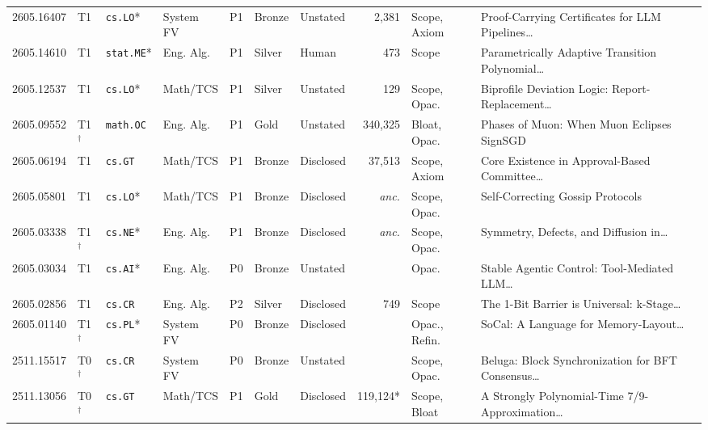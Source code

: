 \documentclass[11pt,letterpaper]{article}
\begin{document}
\begin{longtable}{lllllllrl>{\raggedright\arraybackslash}p{4.05cm}}
2605.16407 & T1 & \texttt{cs.LO}* & System FV & P1 & Bronze & Unstated & 2,381 & Scope, Axiom & Proof-Carrying Certificates for LLM Pipelines\dots~\cite{arxiv2605_16407} \\
2605.14610 & T1 & \texttt{stat.ME}* & Eng. Alg. & P1 & Silver & Human & 473 & Scope & Parametrically Adaptive Transition Polynomial\dots~\cite{arxiv2605_14610} \\
2605.12537 & T1 & \texttt{cs.LO}* & Math/TCS & P1 & Silver & Unstated & 129 & Scope, Opac. & Biprofile Deviation Logic: Report-Replacement\dots~\cite{arxiv2605_12537} \\
2605.09552 & T1$^\dagger$ & \texttt{math.OC} & Eng. Alg. & P1 & Gold & Unstated & 340,325 & Bloat, Opac. & Phases of Muon: When Muon Eclipses SignSGD~\cite{arxiv2605_09552} \\
2605.06194 & T1 & \texttt{cs.GT} & Math/TCS & P1 & Bronze & Disclosed & 37,513 & Scope, Axiom & Core Existence in Approval-Based Committee\dots~\cite{arxiv2605_06194} \\
2605.05801 & T1 & \texttt{cs.LO}* & Math/TCS & P1 & Bronze & Disclosed & \emph{anc.} & Scope, Opac. & Self-Correcting Gossip Protocols~\cite{arxiv2605_05801} \\
2605.03338 & T1$^\dagger$ & \texttt{cs.NE}* & Eng. Alg. & P1 & Bronze & Disclosed & \emph{anc.} & Scope, Opac. & Symmetry, Defects, and Diffusion in\dots~\cite{arxiv2605_03338} \\
2605.03034 & T1 & \texttt{cs.AI}* & Eng. Alg. & P0 & Bronze & Unstated & \textemdash{} & Opac. & Stable Agentic Control: Tool-Mediated LLM\dots~\cite{arxiv2605_03034} \\
2605.02856 & T1 & \texttt{cs.CR} & Eng. Alg. & P2 & Silver & Disclosed & 749 & Scope & The 1-Bit Barrier is Universal: k-Stage\dots~\cite{arxiv2605_02856} \\
2605.01140 & T1$^\dagger$ & \texttt{cs.PL}* & System FV & P0 & Bronze & Disclosed & \textemdash{} & Opac., Refin. & SoCal: A Language for Memory-Layout\dots~\cite{arxiv2605_01140} \\
\midrule
2511.15517 & T0$^\dagger$ & \texttt{cs.CR} & System FV & P0 & Bronze & Unstated & \textemdash{} & Scope, Opac. & Beluga: Block Synchronization for BFT Consensus\dots~\cite{arxiv2511_15517} \\
2511.13056 & T0$^\dagger$ & \texttt{cs.GT} & Math/TCS & P1 & Gold & Disclosed & 119,124* & Scope, Bloat & A Strongly Polynomial-Time 7/9-Approximation\dots~\cite{arxiv2511_13056} \\
\end{longtable}
\endgroup
\end{document}
